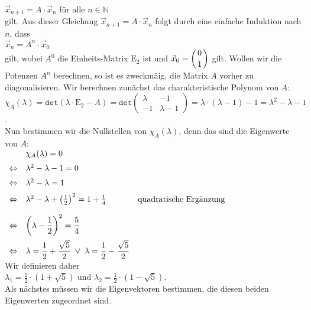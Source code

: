 $\vec{x}_{n+1} = A \cdot \vec{x}_n$ \quad f\"ur alle $n \in \mathbb{N}$
\\[0.2cm]
gilt.  Aus dieser Gleichung $\vec{x}_{n+1} = A \cdot\vec{x}_n$ folgt durch eine einfache Induktion nach $n$, dass
\\[0.2cm]
\hspace*{1.3cm}
$\vec{x}_n = A^n \cdot\vec{x}_0$
\\[0.2cm]
gilt, wobei $A^0$ die Einheits-Matrix $\mathrm{E}_2$ ist und $\displaystyle\vec{x}_0 = \left(0 \atop 1\right)$ gilt.
Wollen wir die Potenzen $A^n$ berechnen, so ist es zweckm\"a\3ig, die Matrix $A$ vorher zu diagonalisieren.  Wir
berechnen zun\"achst das charakteristische Polynom von $A$:
\\[0.2cm]
\hspace*{1.3cm}
$\chi_A(\lambda) = \mathtt{det}(\lambda \cdot \mathrm{E}_2 - A) 
 = \mathtt{det}\left(
   \begin{array}{rr}
     \lambda  &  -1 \\
     -1       & \lambda - 1
   \end{array}
   \right) = \lambda \cdot (\lambda - 1) - 1 = \lambda^2 - \lambda - 1
$.
\\[0.2cm]
Nun bestimmen wir die Nullstellen von $\chi_A(\lambda)$, denn das sind die Eigenwerte von $A$:
\\[0.2cm]
\hspace*{1.3cm}
$
\begin{array}[t]{lll}
                & \chi_A(\lambda) = 0 \\[0.2cm]
\Leftrightarrow & \lambda^2 - \lambda - 1 = 0 \\[0.2cm] 
\Leftrightarrow & \lambda^2 - \lambda     = 1 \\[0.2cm]
\Leftrightarrow & \lambda^2 - \lambda + \left(\frac{1}{2}\right)^2 = 1 + \frac{1}{4} 
                & \mbox{quadratische Erg\"anzung}  \\[0.4cm]
\Leftrightarrow & \displaystyle\left(\lambda - \frac{1}{2}\right)^2 = \frac{5}{4} \\[0.4cm]
\Leftrightarrow & \displaystyle\lambda = \frac{1}{2} + \frac{\sqrt{5}}{2} \;\vee\; \lambda = \frac{1}{2} - \frac{\sqrt{5}}{2} 
\end{array}
$
\\[0.2cm]
Wir definieren daher
\\[0.2cm]
\hspace*{1.3cm}
$\lambda_1 = \frac{1}{2}\cdot(1 + \sqrt{5})$ \quad und \quad $\lambda_2 = \frac{1}{2}\cdot(1 - \sqrt{5})$.
\\[0.2cm]
Als n\"achstes m\"ussen wir die Eigenvektoren bestimmen, die diesen beiden Eigenwerten zugeordnet sind.

